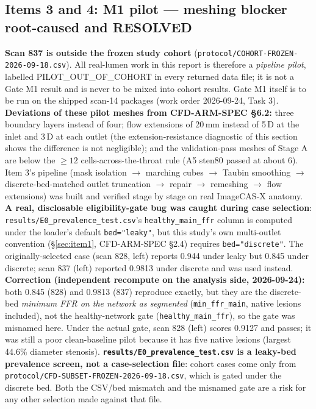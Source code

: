 \documentclass[11pt]{article}
\begin{document}
\subsection{Items 3 and 4: M1 pilot --- meshing blocker root-caused and RESOLVED}
\label{sec:item3}
\textbf{Scan 837 is outside the frozen study cohort} (\texttt{protocol/COHORT-FROZEN-2026-09-18.csv}). All real-lumen work in this report is therefore a \emph{pipeline pilot}, labelled PILOT\_OUT\_OF\_COHORT in every returned data file; it is not a Gate M1 result and is never to be mixed into cohort results. Gate M1 itself is to be run on the shipped scan-14 packages (work order 2026-09-24, Task 3). \textbf{Deviations of these pilot meshes from CFD-ARM-SPEC \S6.2:} three boundary layers instead of four; flow extensions of 20\,mm instead of 5\,D at the inlet and 3\,D at each outlet (the extension-resistance diagnostic of this section shows the difference is not negligible); and the validation-pass meshes of Stage A are below the $\geq12$ cells-across-the-throat rule (A5 sten80 passed at about 6). Item 3's pipeline (mask isolation $\to$ marching cubes $\to$ Taubin smoothing $\to$ discrete-bed-matched
outlet truncation $\to$ repair $\to$ remeshing $\to$ flow extensions) was built and verified stage by
stage on real ImageCAS-X anatomy. \textbf{A real, disclosable eligibility-gate bug was caught during
case selection}: \texttt{results/\allowbreak{}E0\_\allowbreak{}prevalence\_\allowbreak{}test.csv}'s \texttt{healthy\_\allowbreak{}main\_\allowbreak{}ffr} column is
computed under the loader's default \texttt{bed="leaky"}, but this study's own multi-outlet convention
(\S\ref{sec:item1}, CFD-ARM-SPEC \S2.4) requires \texttt{bed="discrete"}. The originally-selected case
(scan 828, left) reports 0.944 under leaky but 0.845 under discrete; scan 837 (left) reported 0.9813 under discrete and was used instead. \textbf{Correction (independent recompute on the analysis side, 2026-09-24):} both 0.845 (828) and 0.9813 (837) reproduce exactly, but they are the discrete-bed \emph{minimum FFR on the network as segmented} (\texttt{min\_ffr\_main}, native lesions included), not the healthy-network gate (\texttt{healthy\_main\_ffr}), so the gate was misnamed here. Under the actual gate, scan 828 (left) scores 0.9127 and passes; it was still a poor clean-baseline pilot because it has five native lesions (largest 44.6\% diameter stenosis). \textbf{\texttt{results/E0\_prevalence\_test.csv} is a leaky-bed prevalence screen, not a case-selection file}: cohort cases come only from \texttt{protocol/CFD-SUBSET-FROZEN-2026-09-18.csv}, which is gated under the discrete bed. Both the CSV/bed mismatch and the misnamed gate are a risk for any other selection made against that file.
\end{document}
